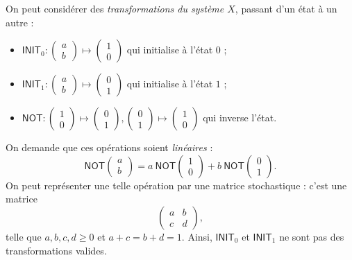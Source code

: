 \documentclass[./main]{subfiles}
\begin{document}
  On peut considérer des \textit{transformations du système $X$}, passant d'un état à un autre :
  \begin{itemize}
    \item $\mathsf{INIT}_0 : \begin{pmatrix} a \\ b \end{pmatrix} \mapsto \begin{pmatrix} 1 \\ 0 \end{pmatrix} $ qui initialise à l'état $0$ ;
    \item $\mathsf{INIT}_1 : \begin{pmatrix} a \\ b \end{pmatrix} \mapsto \begin{pmatrix} 0 \\ 1 \end{pmatrix} $ qui initialise à l'état $1$ ;
    \item $\mathsf{NOT} : \begin{pmatrix} 1 \\ 0 \end{pmatrix} \mapsto \begin{pmatrix} 0 \\ 1 \end{pmatrix}, 
        \begin{pmatrix} 0 \\ 1 \end{pmatrix} \mapsto \begin{pmatrix} 1 \\ 0 \end{pmatrix}
      $ qui inverse l'état.
  \end{itemize}
  On demande que ces opérations soient \textit{linéaires} : 
  \[
  \mathsf{NOT}\begin{pmatrix} a \\ b \end{pmatrix}  = a \: \mathsf{NOT}\begin{pmatrix} 1 \\ 0 \end{pmatrix} + b \: \mathsf{NOT}\begin{pmatrix} 0 \\ 1 \end{pmatrix} 
  .\]
  On peut représenter une telle opération par une matrice stochastique : c'est une matrice 
  \[
    \begin{pmatrix} a & b \\ c & d \end{pmatrix} 
  ,\] 
  telle que $a, b, c, d \ge 0$ et $a + c = b + d = 1$.
  Ainsi, $\mathsf{INIT}_0$ et $\mathsf{INIT}_1$ ne sont pas des transformations valides.
\end{document}
